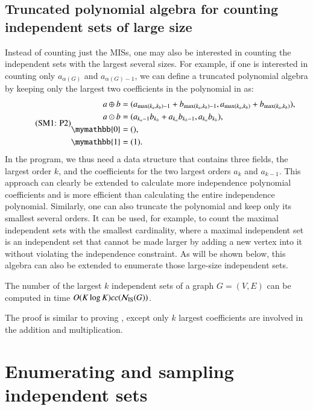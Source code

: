 \documentclass[review, onefignum, onetabnum]{siamart190516}
\begin{document}
\subsection{Truncated polynomial algebra for counting independent sets of large size}
Instead of counting just the MISs, one may also be interested in counting the independent sets with the largest several sizes.
For example, if one is interested in counting only $a_{\alpha(G)}$ and $a_{\alpha(G)-1}$, we can define a truncated polynomial algebra by keeping only the largest two coefficients in the polynomial in  as:
\begin{equation}
    \eqname{P2}
    \begin{split}
    a \oplus b &= (a_{\max(k_a, k_b)-1} + b_{\max(k_a, k_b)-1}, a_{\max(k_a, k_b)} + b_{\max(k_a, k_b)}),\\
    a \odot b &= (a_{k_a-1} b_{k_b}+a_{k_a} b_{k_b-1}, a_{k_a} b_{k_b}),\\
    \mymathbb{0} &= (), \\
    \mymathbb{1} &= (1).\label{eq:max2poly}
    \end{split}
\end{equation}
In the program, we thus need a data structure that contains three fields, the largest order $k$, and the coefficients for the two largest orders $a_k$ and $a_{k-1}$.
This approach can clearly be extended to calculate more independence polynomial coefficients and is more efficient than calculating the entire independence polynomial.
Similarly, one can also truncate the polynomial and keep only its smallest several orders.
It can be used, for example, to count the maximal independent sets with the smallest cardinality, where a maximal independent set is an independent set that cannot be made larger by adding a new vertex into it without violating the independence constraint.
As will be shown below, this algebra can also be extended to enumerate those large-size independent sets.

\begin{lemma}
    The number of the largest $k$ independent sets of a graph $G = (V, E)$ can be computed in time $O(K\log K)cc({\mathcal{N}_{\rm IS}(G)})$.
\end{lemma}
The proof is similar to proving , except only $k$ largest coefficients are involved in the addition and multiplication.

\section{Enumerating and sampling independent sets}\label{sec:enumeration}
\end{document}
